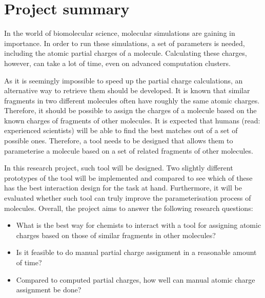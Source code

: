 \chapter{Project summary}

In the world of biomolecular science, molecular simulations are gaining in importance. In order to run these simulations, a set of parameters is needed, including the atomic partial charges of a molecule. Calculating these charges, however, can take a lot of time, even on advanced computation clusters.

As it is seemingly impossible to speed up the partial charge calculations, an alternative way to retrieve them should be developed. It is known that similar fragments in two different molecules often have roughly the same atomic charges. Therefore, it should be possible to assign the charges of a molecule based on the known charges of fragments of other molecules. It is expected that humans (read: experienced scientists) will be able to find the best matches out of a set of possible ones. Therefore, a tool needs to be designed that allows them to parameterise a molecule based on a set of related fragments of other molecules.

In this research project, such tool will be designed. Two slightly different prototypes of the tool will be implemented and compared to see which of these has the best interaction design for the task at hand. Furthermore, it will be evaluated whether such tool can truly improve the parameterisation process of molecules. Overall, the project aims to answer the following research questions:
\begin{itemize}
\item What is the best way for chemists to interact with a tool for assigning atomic charges based on those of similar fragments in other molecules?
\item Is it feasible to do manual partial charge assignment in a reasonable amount of time?
\item Compared to computed partial charges, how well can manual atomic charge assignment be done?
\end{itemize}

